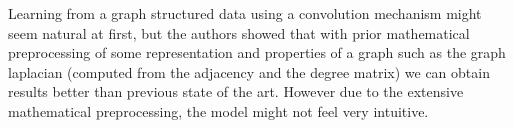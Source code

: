 \documentclass{article}
\begin{document}
Learning from a graph structured data using a convolution mechanism might 
seem natural at first, but the authors showed that with prior mathematical
preprocessing of some representation and properties of a graph such as
the graph laplacian (computed from the adjacency and the degree matrix)
we can obtain results better than previous state of the art.
However due to the extensive mathematical preprocessing, the model
might not feel very intuitive.
\end{document}
